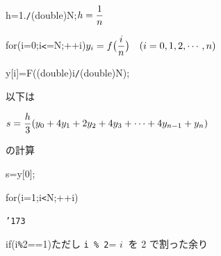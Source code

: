 \documentclass{article}
\begin{document}
\noindent
\mbox{}\hfill

\noindent
\mbox{}{\tt\mc {}\charwd}h{\tt\mc {}\charwd}={\tt\mc {}\charwd}1.{\tt\mc {}\charwd}{\tt /}{\tt\mc {}\charwd}(double){\tt\mc {}\charwd}N;{\tt\mc {}\charwd}{\tt\mc {}\charwd}\rm\mc {\tt /}{\tt *}\charwd  {}$\displaystyle h={1\over n}$
					 \hfill \rm\mc {}\charwd {\tt *}{\tt /}
\tt\mc 

\noindent
\mbox{}{\tt\mc {}\charwd}for{\tt\mc {}\charwd}(i{\tt\mc {}\charwd}={\tt\mc {}\charwd}0;{\tt\mc {}\charwd}i{\tt\mc {}\charwd}{\tt <}={\tt\mc {}\charwd}N;{\tt\mc {}\charwd}++i){\tt\mc {}\charwd}{\tt\mc {}\charwd}\rm\mc {\tt /}{\tt *}\charwd  {}$\displaystyle y_i
					   =f\bigl({i\over n}\bigr)
					   \quad (i=0, 1, 2, \cdots, n)$
					   \hfill \rm\mc {}\charwd {\tt *}{\tt /}
\tt\mc 

\noindent
\mbox{}{\tt\mc {}\charwd}y[i]{\tt\mc {}\charwd}={\tt\mc {}\charwd}F((double){\tt\mc {}\charwd}i{\tt\mc {}\charwd}{\tt /}{\tt\mc {}\charwd}(double){\tt\mc {}\charwd}N);

\noindent
\mbox{}{\tt\mc {}\charwd}{\tt\mc {}\charwd}{\tt\mc {}\charwd}{\tt\mc {}\charwd}{\tt\mc {}\charwd}\rm\mc {\tt /}{\tt *}\charwd 以下は\charwd  \hfill \rm\mc {}\charwd {\tt *}{\tt /}
\tt\mc 

\noindent
\mbox{}{\tt\mc {}\charwd}{\tt\mc {}\charwd}{\tt\mc {}\charwd}{\tt\mc {}\charwd}{\tt\mc {}\charwd}\rm\mc {\tt /}{\tt *}\charwd $\displaystyle
					   s={h\over3}(y_0+4y_1+2y_2+4y_3+
					   \cdots +4y_{n-1}+y_n)$\rm\mc \kern1\charwd  \hfill \rm\mc {}\charwd {\tt *}{\tt /}
\tt\mc 

\noindent
\mbox{}{\tt\mc {}\charwd}{\tt\mc {}\charwd}{\tt\mc {}\charwd}{\tt\mc {}\charwd}{\tt\mc {}\charwd}\rm\mc {\tt /}{\tt *}\charwd の計算\charwd  \hfill \rm\mc {}\charwd {\tt *}{\tt /}
\tt\mc 

\noindent
\mbox{}{\tt\mc {}\charwd}s{\tt\mc {}\charwd}={\tt\mc {}\charwd}y[0];

\noindent
\mbox{}{\tt\mc {}\charwd}for{\tt\mc {}\charwd}(i{\tt\mc {}\charwd}={\tt\mc {}\charwd}1;{\tt\mc {}\charwd}i{\tt\mc {}\charwd}{\tt <}{\tt\mc {}\charwd}N;{\tt\mc {}\charwd}++i)

\noindent
\mbox{}{\tt\mc {}\charwd}{\tt\char'173}

\noindent
\mbox{}{\tt\mc {}\charwd}if{\tt\mc {}\charwd}(i{\tt\mc {}\charwd}{\tt\%}{\tt\mc {}\charwd}2{\tt\mc {}\charwd}=={\tt\mc {}\charwd}1){\tt\mc {}\charwd}{\tt\mc {}\charwd}{\tt\mc {}\charwd}\rm\mc {\tt /}{\tt *}\charwd  {}ただし {\tt i \% 2}= $i\ $
					   を 2 で割った余り \hfill \rm\mc {}\charwd {\tt *}{\tt /}
\tt\mc 
\end{document}
